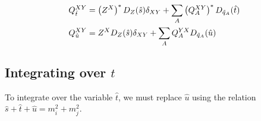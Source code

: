 \documentclass[english,notitlepage]{article}
\begin{document}
    \begin{subequations}
        \begin{align}
            Q^{XY}_{\hat{t}} & = \left(Z^X\right)^\ast D_Z(\hat{s}) \delta_{XY} + \sum_A \left(Q_A^{XY}\right)^\ast D_{\tilde{q}_A}(\hat{t}) \\
            Q^{XY}_{\hat{u}} & = Z^X D_Z(\hat{s}) \delta_{XY} + \sum_A Q_A^{YX} D_{\tilde{q}_A}(\hat{u})
        \end{align}
    \end{subequations}

\subsection{Integrating over \(t\)}
    To integrate over the variable \(\hat{t}\), we must replace \(\hat{u}\) using the relation \(\hat{s} + \hat{t} + \hat{u} = m_i^2 + m_j^2\).
\end{document}
